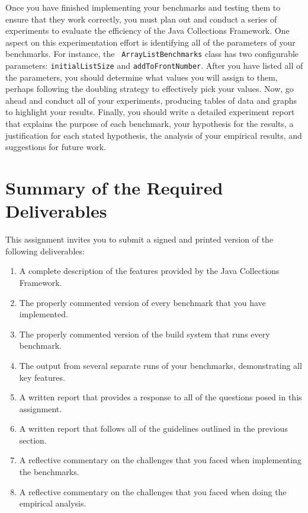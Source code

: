 Once you have finished implementing your benchmarks and testing them to ensure that they work correctly, you must plan
out and conduct a series of experiments to evaluate the efficiency of the Java Collections Framework. One aspect on this
experimentation effort is identifying all of the parameters of your benchmarks. For instance, the {\tt
ArrayListBenchmarks} class has two configurable parameters: {\tt initialListSize} and {\tt addToFrontNumber}. After you
have listed all of the parameters, you should determine what values you will assign to them, perhaps following the
doubling strategy to effectively pick your values. Now, go ahead and conduct all of your experiments, producing tables
of data and graphs to highlight your results. Finally, you should write a detailed experiment report that explains the
purpose of each benchmark, your hypothesis for the results, a justification for each stated hypothesis, the analysis of
your empirical results, and suggestions for future work.

\section*{Summary of the Required Deliverables}

  This assignment invites you to submit a signed and printed version of the following deliverables:

  \begin{enumerate}
  \itemsep0pt

  \item A complete description of the features provided by the Java Collections Framework.

  \item The properly commented version of every benchmark that you have implemented.

  \item The properly commented version of the build system that runs every benchmark.

  \item The output from several separate runs of your benchmarks, demonstrating all key features.

  \item A written report that provides a response to all of the questions posed in this assignment.

  \item A written report that follows all of the guidelines outlined in the previous section.

  \item A reflective commentary on the challenges that you faced when implementing the benchmarks.

  \item A reflective commentary on the challenges that you faced when doing the empirical analysis.

  \end{enumerate}

